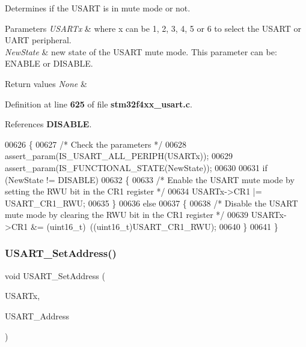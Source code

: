 Determines if the U\+S\+A\+RT is in mute mode or not. 


\begin{DoxyParams}{Parameters}
{\em U\+S\+A\+R\+Tx} & where x can be 1, 2, 3, 4, 5 or 6 to select the U\+S\+A\+RT or U\+A\+RT peripheral. \\
\hline
{\em New\+State} & new state of the U\+S\+A\+RT mute mode. This parameter can be\+: E\+N\+A\+B\+LE or D\+I\+S\+A\+B\+LE. \\
\hline
\end{DoxyParams}

\begin{DoxyRetVals}{Return values}
{\em None} & \\
\hline
\end{DoxyRetVals}


Definition at line \textbf{ 625} of file \textbf{ stm32f4xx\+\_\+usart.\+c}.



References \textbf{ D\+I\+S\+A\+B\+LE}.


\begin{DoxyCode}
00626 \{
00627   \textcolor{comment}{/* Check the parameters */}
00628   assert_param(IS_USART_ALL_PERIPH(USARTx));
00629   assert_param(IS_FUNCTIONAL_STATE(NewState)); 
00630   
00631   \textcolor{keywordflow}{if} (NewState != DISABLE)
00632   \{
00633     \textcolor{comment}{/* Enable the USART mute mode  by setting the RWU bit in the CR1 register */}
00634     USARTx->CR1 |= USART_CR1_RWU;
00635   \}
00636   \textcolor{keywordflow}{else}
00637   \{
00638     \textcolor{comment}{/* Disable the USART mute mode by clearing the RWU bit in the CR1 register */}
00639     USARTx->CR1 &= (uint16\_t)~((uint16\_t)USART_CR1_RWU);
00640   \}
00641 \}
\end{DoxyCode}
\mbox{\label{group__USART__Group3_ga65ec9928817f3f031dd9a4dfc95d6666}} 
\subsubsection{U\+S\+A\+R\+T\+\_\+\+Set\+Address()}
{\footnotesize\ttfamily void U\+S\+A\+R\+T\+\_\+\+Set\+Address (\begin{DoxyParamCaption}\item[{\textbf{ U\+S\+A\+R\+T\+\_\+\+Type\+Def} $\ast$}]{U\+S\+A\+R\+Tx,  }\item[{uint8\+\_\+t}]{U\+S\+A\+R\+T\+\_\+\+Address }\end{DoxyParamCaption})}



